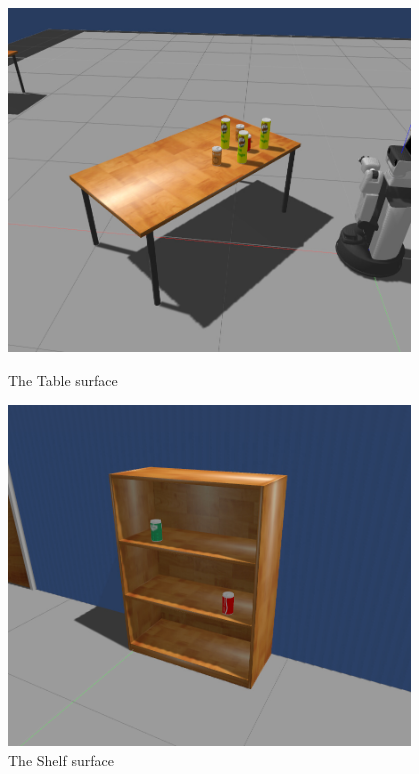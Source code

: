 \documentclass[main.tex]{subfiles}
\begin{document}
\begin{figure}
\label{fig:kn_surfaces}
    \centering
    \begin{minipage}{0.45\textwidth}
        \centering
        \includegraphics[width=0.95\textwidth]{pictures/knowledge/table}
        \caption{The Table surface}
        \label{fig:kn_first_surface}
    \end{minipage}\hfill
    \begin{minipage}{0.48\textwidth}
        \centering
        \includegraphics[width=0.95\textwidth]{pictures/knowledge/shelf}
        \caption{The Shelf surface}

\end{minipage}
\end{figure}
\end{document}
